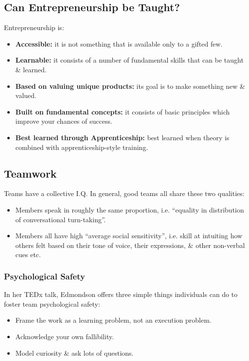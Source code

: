 \documentclass[a4paper,11pt]{article}
\begin{document}
\subsection{Can Entrepreneurship be Taught?}
Entrepreneurship is:
\begin{itemize}
    \item   \textbf{Accessible:} it is not something that is available only to a gifted few.
    \item   \textbf{Learnable:} it consists of a number of fundamental skills that can be taught \& learned.
    \item   \textbf{Based on valuing unique products:} its goal is to make something new \& valued.
    \item   \textbf{Built on fundamental concepts:} it consists of basic principles which improve your chances of 
            success.
    \item   \textbf{Best learned through Apprenticeship:} best learned when theory is combined with apprenticeship-style 
            training.
\end{itemize}

\subsection{Teamwork}
Teams have a collective I.Q.
In general, good teams all share these two qualities:
\begin{itemize}
    \item   Members speak in roughly the same proportion, i.e. ``equality in distribution of conversational turn-taking''.
    \item   Members all have high ``average social sensitivity'', i.e. skill at intuiting how others felt based on their 
            tone of voice, their expressions, \& other non-verbal cues etc.
\end{itemize}

\subsubsection{Psychological Safety}
In her TEDx talk, Edmondson offers three simple things individuals can do to foster team psychological safety:
\begin{itemize}
    \item   Frame the work as a learning problem, not an execution problem.
    \item   Acknowledge your own fallibility.
    \item   Model curiosity \& ask lots of questions.
\end{itemize}
\end{document}
